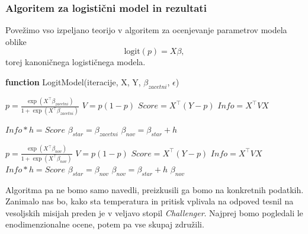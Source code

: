 \documentclass[12pt,a4paper]{amsart}
\theoremstyle{definition} %
\theoremstyle{plain} %
\begin{document}
\subsubsection{Algoritem za logistični model in rezultati}
Povežimo vso izpeljano teorijo v algoritem za ocenjevanje parametrov modela oblike
\[
    \mathrm{logit}(p) = X\beta,
\]
torej kanoničnega logističnega modela.
\begin{algorithm}[H]
    \caption{\textbf{function} LogitModel(iteracije, X, Y, $\beta_{zacetni}$, $\epsilon$)}
\begin{algorithmic}
    
    \STATE $p = \frac{\exp{(X^\top \beta_{zacetni})}}{1 + \exp{(X^\top \beta_{zacetni})}}$
    \STATE $V = p(1 - p)$ 
    \STATE $Score = X^\top (Y - p)$ 
    \STATE $Info = X^\top V X$ 
    
    \STATE {} $Info * h = Score$
    \STATE $\beta_{star} = \beta_{zacetni}$
    \STATE $\beta_{nov} = \beta_{star} + h$
        
            \STATE $p = \frac{\exp{(X^\top \beta_{nov})}}{1 + \exp{(X^\top \beta_{nov})}}$ 
            \STATE $V = p(1 - p)$ 
            \STATE $Score = X^\top (Y - p)$ 
            \STATE $Info = X^\top V X$ 
            \STATE {}
            \STATE $Info * h = Score$ 
            \STATE $\beta_{star} = \beta_{nov}$ 
            \STATE $\beta_{nov} = \beta_{star} + h$ 
        \ELSE
        \STATE {}
        \RETURN $\beta_{nov}$
        \ENDIF
    \ENDWHILE
\end{algorithmic}
\end{algorithm}
Algoritma pa ne bomo samo navedli, preizkusili ga bomo na konkretnih podatkih. Zanimalo nas bo, kako sta temperatura in pritisk vplivala na odpoved
tesnil na vesoljskih misijah preden je v veljavo stopil \textit{Challenger}. Najprej bomo pogledali le enodimenzionalne ocene, potem pa vse skupaj združili.
\end{document}
